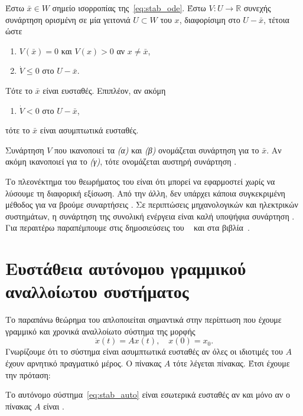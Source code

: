 \begin{theorem} 
    Έστω \( \bar{x} \in W \) σημείο ισορροπίας της~\eqref{eq:stab_ode}. Έστω \(
    V: U \to \mathbb{R} \) συνεχής συνάρτηση ορισμένη σε μία γειτονιά \( U
    \subset W \) του \( x \), διαφορίσιμη στο \( U - \bar{x} \), τέτοια ώστε
    \begin{enumerate} [label = (\enumgreek*)]
        \item \( V(\bar{x}) = 0 \) και \( V(x) > 0 \) αν \( x \neq
            \bar{x} \),
        \item \( \dot{V} \leq 0 \) στο \( U - \bar{x} \).
    \end{enumerate}
    Τότε το \( \bar{x} \) είναι ευσταθές. Επιπλέον, αν ακόμη
    \begin{enumerate} [label = (\enumgreek*),resume]
        \item \( \dot{V} <  0 \) στο \( U - \bar{x} \),
    \end{enumerate}
    τότε το \( \bar{x} \) είναι ασυμπτωτικά ευσταθές.
\end{theorem}

Συνάρτηση \( V \) που ικανοποιεί τα \emph{(α)} και \emph{(β)} ονομάζεται συνάρτηση
 για το \( \bar{x} \). Αν ακόμη ικανοποιεί για το \emph{(γ)}, τότε
ονομάζεται αυστηρή συνάρτηση .

Το πλεονέκτημα του θεωρήματος του  είναι ότι μπορεί να εφαρμοστεί
χωρίς να λύσουμε τη διαφορική εξίσωση. Από την άλλη, δεν υπάρχει κάποια
συγκεκριμένη μέθοδος για να βρούμε συναρτήσεις . Σε περιπτώσεις
μηχανολογικών και ηλεκτρικών συστημάτων, η συνάρτηση της συνολική ενέργεια είναι
καλή υποψήφια συνάρτηση . Για περαιτέρω παραπέμπουμε στις
δημοσιεύσεις του ~\cite{lyapunov1992general} και στα
βιβλία~\cite{hirsch1974differential}.

\section{Ευστάθεια αυτόνομου γραμμικού αναλλοίωτου συστήματος}
Το παραπάνω θεώρημα του  απλοποιείται σημαντικά στην περίπτωση που
έχουμε γραμμικό και χρονικά αναλλοίωτο σύστημα της μορφής
\begin{equation}\label{eq:stab_auto}
    \dot{x}(t) = Ax(t),\quad x(0) = x_0.
\end{equation}
Γνωρίζουμε ότι το σύστημα είναι ασυμπτωτικά ευσταθές αν όλες οι ιδιοτιμές του
\( A \) έχουν αρνητικό πραγματικό μέρος. Ο πίνακας \( A \) τότε λέγεται
 πίνακας. Έτσι έχουμε την πρόταση:
\begin{prop} 
    Το αυτόνομο σύστημα~\eqref{eq:stab_auto} είναι εσωτερικά ευσταθές αν και
    μόνο αν ο πίνακας \( A \) είναι .
\end{prop}

